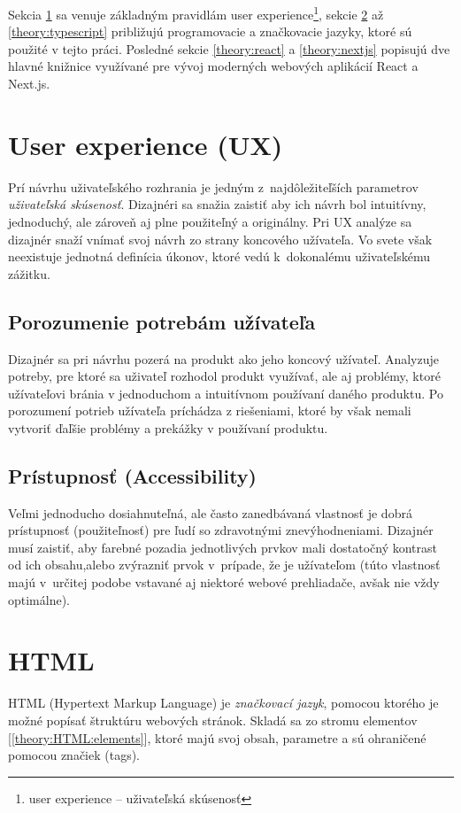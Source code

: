 Sekcia \ref{theory:UX} sa venuje základným pravidlám user experience\footnote{user experience -- uživateľská skúsenosť}, sekcie \ref{theory:HTML} až \ref{theory:typescript} približujú programovacie a značkovacie jazyky, ktoré sú použité v tejto práci. Posledné sekcie \ref{theory:react} a \ref{theory:nextjs} popisujú dve hlavné knižnice využívané pre vývoj moderných webových aplikácií React a Next.js.

\section{User experience (UX)}
\label{theory:UX}
Prí návrhu uživateľského rozhrania je jedným z~najdôležiteľších parametrov \emph{uživateľská skúsenosť}. Dizajnéri sa snažia zaistiť aby ich návrh bol intuitívny, jednoduchý, ale zároveň aj plne použiteľný a originálny. Pri UX analýze sa dizajnér snaží vnímať svoj návrh zo strany koncového užívateľa. Vo svete však neexistuje jednotná definícia úkonov, ktoré vedú k~dokonalému uživateľskému zážitku.

\subsection{Porozumenie potrebám užívateľa}
Dizajnér sa pri návrhu pozerá na produkt ako jeho koncový užívateľ. Analyzuje potreby, pre ktoré sa uživateľ rozhodol produkt využívať, ale aj problémy, ktoré užívateľovi bránia v jednoduchom a intuitívnom používaní daného produktu. Po porozumení potrieb užívateľa príchádza z riešeniami, ktoré by však nemali vytvoriť ďaľšie problémy a prekážky v používaní produktu.

\subsection{Prístupnosť (Accessibility)}
Veľmi jednoducho dosiahnuteľná, ale často zanedbávaná vlastnosť je dobrá prístupnosť (použiteľnosť) pre ľudí so zdravotnými znevýhodneniami. Dizajnér musí zaistiť, aby farebné pozadia jednotlivých prvkov mali dostatočný kontrast od ich obsahu,alebo zvýrazniť prvok v~prípade, že je užívateľom (túto vlastnosť majú v~určitej podobe vstavané aj niektoré webové prehliadače, avšak nie vždy optimálne).

\section{HTML}
\label{theory:HTML}
HTML (Hypertext Markup Language) je \emph{značkovací jazyk}, pomocou ktorého je možné popísať štruktúru webových stránok. Skladá sa zo stromu elementov [\ref{theory:HTML:elements}], ktoré majú svoj obsah, parametre a sú ohraničené pomocou značiek (tags).

